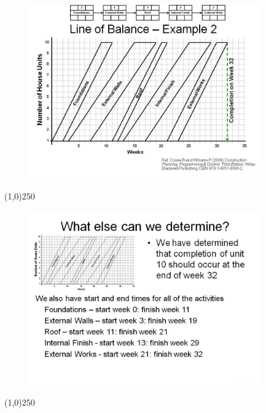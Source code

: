 \begin{frame}
\begin{figure}
	\centering
		\includegraphics[width = 10.0cm]{oldnotes/Slide266.jpg}
\end{figure}
\end{frame}
\begin{center}\line(1,0){250}\end{center}






\begin{frame}
\begin{figure}
	\centering
		\includegraphics[width = 10.0cm]{oldnotes/Slide267.jpg}
\end{figure}
\end{frame}
\begin{center}\line(1,0){250}\end{center}






